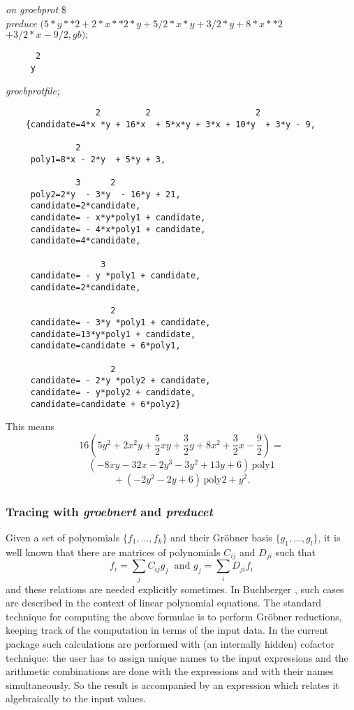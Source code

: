 {\it on groebprot} \$ \\
{\it preduce} $ (5*y**2 + 2*x**2*y + 5/2*x*y + 3/2*y + 8*x**2 $ \\
\hspace*{+1cm} $+ 3/2*x - 9/2, gb);$
\begin{verbatim}
      2
     y
\end{verbatim}
{\it groebprotfile;}
\begin{verbatim}
                  2         2                     2
    {candidate=4*x *y + 16*x  + 5*x*y + 3*x + 10*y  + 3*y - 9,

              2
     poly1=8*x - 2*y  + 5*y + 3,

              3      2
     poly2=2*y  - 3*y  - 16*y + 21,
     candidate=2*candidate,
     candidate= - x*y*poly1 + candidate,
     candidate= - 4*x*poly1 + candidate,
     candidate=4*candidate,

                   3
     candidate= - y *poly1 + candidate,
     candidate=2*candidate,

                     2
     candidate= - 3*y *poly1 + candidate,
     candidate=13*y*poly1 + candidate,
     candidate=candidate + 6*poly1,

                     2
     candidate= - 2*y *poly2 + candidate,
     candidate= - y*poly2 + candidate,
     candidate=candidate + 6*poly2}
\end{verbatim}
This means
\[
16 (5 y^2 + 2 x^2 y + \frac{5}{2} x y + \frac{3}{2} y
+ 8 x^2+ \frac{3}{2} x - \frac{9}{2})=
\]
\[
(-8 x y -32 x -2 y^3 -3 y^2 + 13 y + 6)\,\mbox{poly1}
\]
\[
\mbox{} + (-2 y^2 -2 y + 6)\,\mbox{poly2} + y^2.
\]

\subsubsection{Tracing with \emph{groebnert} and \emph{preducet}}
Given a set of polynomials $\{f_1,\ldots ,f_k\}$ and their Gr\"obner
basis $\{g_1,\ldots ,g_l\}$, it is well known that there are matrices of
polynomials $C_{ij}$ and $D_{ji}$ such that
\[
f_i = \displaystyle{\sum\limits_j} C_{ij} g_j \;\mbox{  and  } g_j =
\displaystyle{\sum\limits_i} D_{ji} f_i
\]
and these relations are needed explicitly sometimes.
In {\sc Buchberger} \cite{Buchberger:85}, such cases are described in the
context of linear polynomial equations. The standard technique for
computing the above formulae is to perform
Gr\"obner reductions, keeping track of the
computation in terms of the input data. In the current package such
calculations are performed with (an internally hidden) cofactor
technique: the user has to assign unique names to the input
expressions and the  arithmetic combinations are done with the
expressions and with their names simultaneously. So the result is
accompanied by an expression which relates it algebraically to the
input values.

